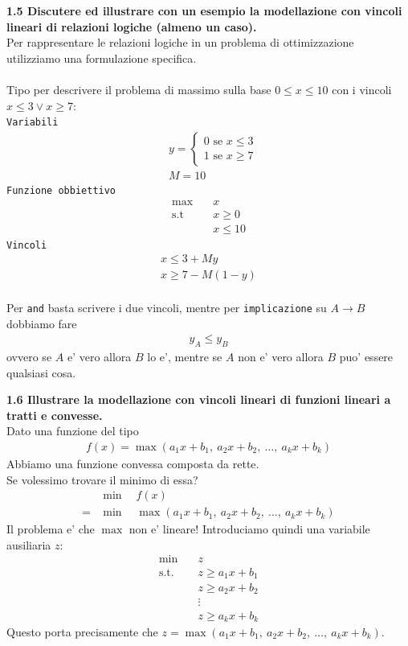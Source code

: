 \documentclass[a4paper,11pt]{article}
\newcommand{\domanda}[2]{%
  \vspace{0.6em}
  \noindent\textbf{#1}\\[0.2em]
  \noindent#2
  \vspace{1em}
  \par
}
\begin{document}
\domanda{1.5 \quad Discutere ed illustrare con un esempio la modellazione con vincoli lineari di relazioni logiche (almeno un caso).}{
Per rappresentare le relazioni logiche in un problema di ottimizzazione utilizziamo una formulazione specifica. \\
\vspace{1px}\\
Tipo per descrivere il problema di massimo sulla base $0 \leq x \leq 10$ con i vincoli $x \leq 3 \lor x \geq 7$:\\
\texttt{Variabili}
\begin{align*}
    &y = \begin{cases}
        0 \text{ se } x \leq 3\\
        1 \text{ se } x \geq 7
    \end{cases}\\
    &M=10
\end{align*}
\texttt{Funzione obbiettivo}
\begin{align*}
    \max \quad &x \\
    \text{s.t } \quad &x \geq 0\\
    &x \leq 10
\end{align*}
\texttt{Vincoli}
\begin{align*}
    x \leq 3 + My \\
    x \geq 7 - M(1-y)
\end{align*}
\vspace{1px}\\
Per \texttt{and} basta scrivere i due vincoli, mentre per \texttt{implicazione} su $A \to B$ dobbiamo fare
\begin{align*}
    y_A \leq y_B
\end{align*}
ovvero se $A$ e' vero allora $B$ lo e', mentre se $A$ non e' vero allora $B$ puo' essere qualsiasi cosa.
}

\domanda{1.6 \quad Illustrare la modellazione con vincoli lineari di funzioni lineari a tratti e convesse.}{
Dato una funzione del tipo
\begin{align*}
    f(x) = \max(a_1x+b_1,\ a_2x+b_2,\ \dots,\ a_kx+b_k)
\end{align*}
Abbiamo una funzione convessa composta da rette.\\
Se volessimo trovare il minimo di essa?
\begin{align*}
    &\min \quad f(x)\\
    =&\min \quad \max(a_1x+b_1,\ a_2x+b_2,\ \dots,\ a_kx+b_k)
\end{align*}
Il problema e' che $\max$ non e' lineare! Introduciamo quindi una variabile ausiliaria $z$:
\begin{align*}
    \min \quad &z\\
    \text{s.t. }\quad &z \geq a_1x+b_1\\
    &z \geq a_2x+b_2\\
    &\vdots\\
    &z \geq a_kx+b_k
\end{align*}
Questo porta precisamente che $z = \max(a_1x+b_1,\ a_2x+b_2,\ \dots,\ a_kx+b_k)$.
}
\end{document}
